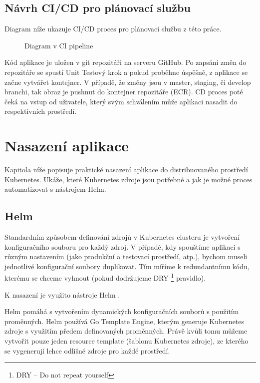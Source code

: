 \documentclass[thesis=M,czech]{FITthesis}[2019/12/23]
\theoremstyle{plain}
\theoremstyle{definition}
\begin{document}
\subsection{Návrh CI/CD pro plánovací službu}

Diagram níže ukazuje CI/CD proces pro plánovací službu z této práce.



\begin{figure}[H]\centering
	

	\caption[Diagram v CI pipeline]{Diagram v CI pipeline}\label{fig:float}
\end{figure}

Kód aplikace je uložen v git repozitáři na serveru GitHub. Po zapsání změn do repozitáře se spustí Unit Testový krok a pokud proběhne úspěšně, z aplikace se začne vytvářet kontejner. V případě, že změny jsou v master, staging, či develop branchi, tak obraz je pushnut do kontejner repozitáře (ECR). CD proces poté čeká na vstup od uživatele, který svým schválením může aplikaci nasadit do respektivních prostředí.


\section{Nasazení aplikace}

Kapitola níže popisuje praktické nasazení aplikace do distribuovaného prostředí Kubernetes. Ukáže, které Kubernetes zdroje jsou potřebné a jak je možné proces automatizovat s nástrojem Helm. 


\subsection{Helm}



Standardním způsobem definování zdrojů v Kubernetes clusteru je vytvoření konfiguračního souboru pro každý zdroj. V případě, kdy spouštíme aplikaci s různým nastavením (jako produkční a testovací prostředí, atp.), bychom museli jednotlivé konfigurační soubory duplikovat. Tím míříme k redundantnímu kódu, kterému se chceme vyhnout (pokud dodržujeme DRY \footnote{DRY -- Do not repeat yourself} pravidlo).

K nasazení je využito nástroje Helm \cite{helm-docs}.

Helm pomáhá s vytvořením dynamických konfiguračních souborů s použitím proměnných. Helm používá Go Template Engine, kterým generuje Kubernetes zdroje s využitím předem definovaných proměnných. Právě kvůli tomu můžeme vytvořit pouze jeden resource template (šablonu Kubernetes zdroje), ze kterého se vygenerují lehce odlišné zdroje pro každé prostředí. 
\end{document}
